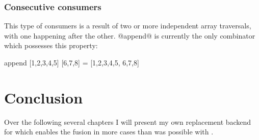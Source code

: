\documentclass[preamble.tex]{subfiles}
\begin{document}
\subsubsection{Consecutive consumers}

This type of consumers is a result of two or more independent array traversals, with one happening after the other. @append@ is currently the only combinator which possesses this property:

\begin{hscode}
append [1,2,3,4,5] [6,7,8] = [1,2,3,4,5, 6,7,8]
\end{hscode}


\section{Conclusion}

Over the following several chapters I will present my own replacement backend for  which enables the fusion in more cases than was possible with .


\IfNotCompilingAll{\printbibliography}
\end{document}
